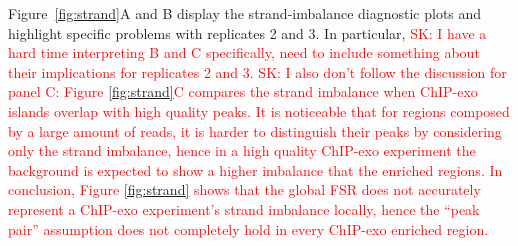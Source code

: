 \documentclass{bmcart}
\newcommand{\SK}[1]{\textcolor{red}{SK: #1}}
\begin{document}
Figure~\ref{fig:strand}A and B display the strand-imbalance diagnostic plots and highlight specific problems with replicates 2 and 3. In particular, \SK{I have a hard time interpreting B and C specifically, need to include something about their implications for replicates 2 and 3.}
\SK{I also don't follow the discussion for panel C: Figure
\ref{fig:strand}C compares the strand imbalance when ChIP-exo islands 
overlap with high quality peaks. It is noticeable that for regions
composed by a large amount of reads, it is harder to distinguish their
peaks by considering only the strand imbalance, hence in a high
quality ChIP-exo experiment the background is expected to show a
higher imbalance that the enriched regions. In conclusion, Figure
\ref{fig:strand} shows that the global FSR does not accurately
represent a ChIP-exo experiment's strand imbalance locally, hence the
``peak pair'' assumption does not completely hold in every ChIP-exo
enriched region.}
\end{document}

